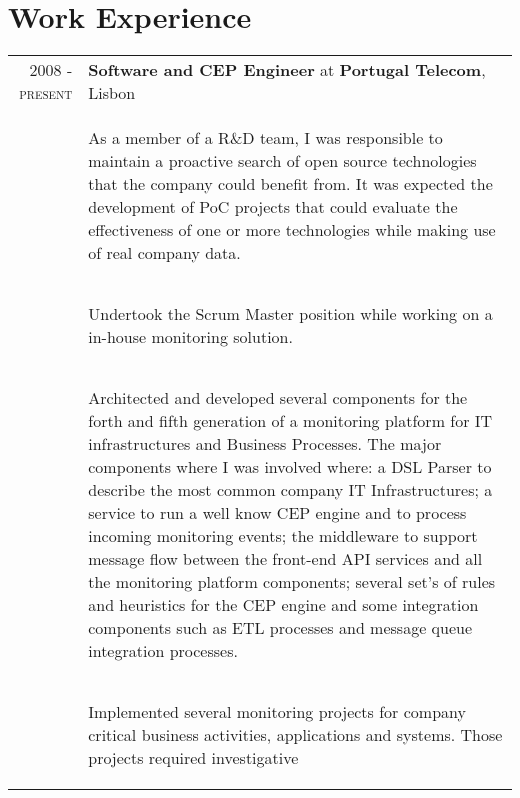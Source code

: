 \documentclass[a4paper,10pt]{article}
\begin{document}
\section{Work Experience}
\begin{tabular}{rp{11cm}}
  \textsc{2008 - present} & \textbf{Software and CEP Engineer} at \textbf{Portugal Telecom}, Lisbon\\ 
  & \begin{compactitem} 
     \item As a member of a R\&D team, I was responsible to maintain a proactive search of open source technologies that the company could benefit from. It was expected the development of PoC projects that could evaluate the effectiveness of one or more technologies while making use of real company data. 
     \end{compactitem}\vspace{-1em} \\
  & \begin{compactitem} 
     \item Undertook the Scrum Master position while working on a in-house monitoring solution.
     \end{compactitem}\vspace{-1em} \\
  & \begin{compactitem}
     \item Architected and developed several components for the forth and fifth generation of a monitoring platform for IT infrastructures and Business Processes. The major components where I was involved where: a DSL Parser to describe the most common company IT Infrastructures; a service to run a well know CEP engine and to process incoming monitoring events; the middleware to support message flow between the front-end API services and all the monitoring platform components; several set's of rules and heuristics for the CEP engine and some integration components such as ETL processes and message queue integration processes.
     \end{compactitem}\vspace{-1em} \\
  & \begin{compactitem} 
     \item 
     Implemented several monitoring projects for company critical business
activities, applications and systems. Those projects required investigative

\end{compactitem}
\end{tabular}
\end{document}
